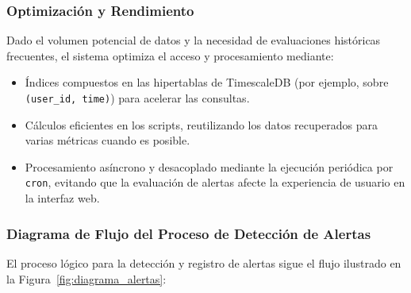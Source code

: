 \subsubsection*{Optimización y Rendimiento}
Dado el volumen potencial de datos y la necesidad de evaluaciones históricas frecuentes, el sistema optimiza el acceso y procesamiento mediante:
\begin{itemize}
    \item Índices compuestos en las hipertablas de TimescaleDB (por ejemplo, sobre \texttt{(user\_id, time)}) para acelerar las consultas.
    \item Cálculos eficientes en los scripts, reutilizando los datos recuperados para varias métricas cuando es posible.
    \item Procesamiento asíncrono y desacoplado mediante la ejecución periódica por \texttt{cron}, evitando que la evaluación de alertas afecte la experiencia de usuario en la interfaz web.
\end{itemize}

\subsubsection*{Diagrama de Flujo del Proceso de Detección de Alertas}
El proceso lógico para la detección y registro de alertas sigue el flujo ilustrado en la Figura~\ref{fig:diagrama_alertas}:

